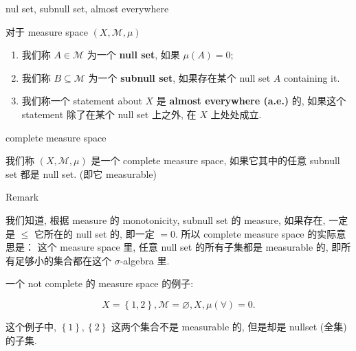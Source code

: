 \documentclass{qlnotes-export}
\begin{document}
\begin{definition}{nul set, subnull set, almost everywhere}\label{def-02-outer-measure-completion-of-a-measurable-space-nul-set-subnull-set-almost-everywhere}

对于 measure space \((X,\mathcal{M},\mu)\)

\begin{enumerate}
\item
  我们称 \(A \in \mathcal{M}\) 为一个 \textbf{null set}, 如果 \(\mu(A) = 0\);
\item
  我们称 \(B \subseteq \mathcal{M}\) 为一个 \textbf{subnull set}, 如果存在某个 null set \(A\) containing it.
\item
  我们称一个 statement about \(X\) 是 \textbf{almost everywhere (a.e.)} 的, 如果这个 statement 除了在某个 null set 上之外, 在 \(X\) 上处处成立.
\end{enumerate}

\end{definition}

\begin{definition}{complete measure space}\label{def-02-outer-measure-completion-of-a-measurable-space-complete-measure-space}

我们称 \((X,\mathcal{M},\mu)\) 是一个 complete measure space, 如果它其中的任意 subnull set 都是 null set. (即它 measurable)

\end{definition}

\begin{qlremark}{Remark}

我们知道, 根据 measure 的 monotonicity, subnull set 的 measure, 如果存在, 一定是 \(\leq\) 它所在的 null set 的, 即一定 \(= 0\). 所以 complete measure space 的实际意思是： 这个 measure space 里, 任意 null set 的所有子集都是 measurable 的, 即所有足够小的集合都在这个 \(\sigma\)-algebra 里.

\end{qlremark}

\begin{example}\label{ex-02-outer-measure-completion-of-a-measurable-space-example-001}

一个 not complete 的 measure space 的例子:

\[X = \left\{ {1,2} \right\},\mathcal{M} = \varnothing,X,\mu(\forall) = 0.\]

这个例子中, \(\left\{ 1 \right\},\left\{ 2 \right\}\) 这两个集合不是 measurable 的, 但是却是 nullset (全集) 的子集.

\end{example}
\end{document}
